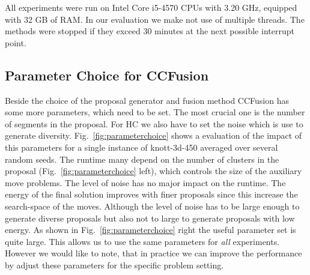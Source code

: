 \documentclass[10pt,twocolumn,letterpaper]{article}
\begin{document}
All experiments were run on Intel Core i5-4570 CPUs
with 3.20 GHz, equipped with 32 GB of RAM.
In our evaluation we make not use of multiple threads.
The methods were stopped if they exceed 30 minutes at the next possible interrupt point.

\subsection{Parameter Choice for CCFusion}
Beside the choice of the proposal generator and fusion method CCFusion has some more parameters, which need to be set.
The most crucial one is the number of segments in the proposal. For HC we also have to set the noise which is use to generate diversity.
Fig.~\ref{fig:parameterchoice} shows a evaluation of the impact of this parameters for a single instance of knott-3d-450 averaged over several random seeds.
The runtime many depend on the number of clusters in the proposal (Fig.~\ref{fig:parameterchoice} left), which controls the size of the auxiliary move problems.
The level of noise has no major impact on the runtime.
The energy of the final solution improves with finer proposals since this increase the search-space of the moves.
Although the level of noise has to be large enough to generate diverse proposals but also not to large to generate proposals with low energy.
As shown in Fig.~\ref{fig:parameterchoice} right the useful parameter set is quite large. This allows us to use the same parameters for \emph{all}
experiments. However we would like to note, that in practice we can improve the performance by adjust these parameters for the specific problem setting.
%
%
\end{document}
